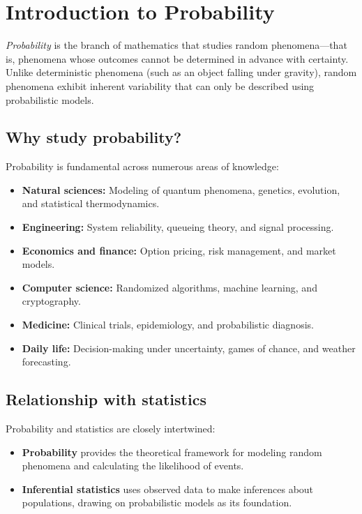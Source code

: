 \section*{Introduction to Probability}

\emph{Probability} is the branch of mathematics that studies random phenomena—that is, phenomena whose outcomes cannot be determined in advance with certainty. Unlike deterministic phenomena (such as an object falling under gravity), random phenomena exhibit inherent variability that can only be described using probabilistic models.

\subsection*{Why study probability?}

Probability is fundamental across numerous areas of knowledge:

\begin{itemize}
	\item \textbf{Natural sciences:} Modeling of quantum phenomena, genetics, evolution, and statistical thermodynamics.
	\item \textbf{Engineering:} System reliability, queueing theory, and signal processing.
	\item \textbf{Economics and finance:} Option pricing, risk management, and market models.
	\item \textbf{Computer science:} Randomized algorithms, machine learning, and cryptography.
	\item \textbf{Medicine:} Clinical trials, epidemiology, and probabilistic diagnosis.
	\item \textbf{Daily life:} Decision-making under uncertainty, games of chance, and weather forecasting.
\end{itemize}

\subsection*{Relationship with statistics}

Probability and statistics are closely intertwined:

\begin{itemize}
	\item \textbf{Probability} provides the theoretical framework for modeling random phenomena and calculating the likelihood of events.
	\item \textbf{Inferential statistics} uses observed data to make inferences about populations, drawing on probabilistic models as its foundation.
\end{itemize}

